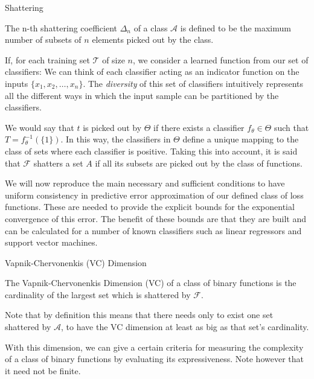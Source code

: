 \begin{appendices}
\begin{definition}{Shattering}

\end{definition}

The n-th shattering coefficient $\Delta_n$ of a class $\mathcal {A}$ is defined to be the maximum number of subsets of $n$ elements picked out by the class.

If, for each training set $\mathcal {T}$ of size $n$, we consider a learned function from our set of classifiers:
We can think of each classifier acting as an indicator function on the inputs $\{ x_1,x_2,\ldots,x_n \}$.
The \textit{diversity} of this set of classifiers intuitively represents all the different ways in which the input sample can be partitioned by the classifiers.

We would say that $t$ is picked out by $\Theta$ if there exists a classifier $f_{\theta} \in \Theta$ such that $T = f_{\theta}^{-1}(\{1\})$.
In this way, the classifiers in $\Theta$ define a unique mapping to the class of sets where each classifier is positive.
Taking this into account, it is said that $\mathcal {F}$ shatters a set $A$ if all its subsets are picked out by the class of functions.

We will now reproduce the main necessary and sufficient conditions to have uniform consistency in predictive error approximation of our defined class of loss functions.
These are needed to provide the explicit bounds for the exponential convergence of this error.
The benefit of these bounds are that they are built and can be calculated for a number of known classifiers such as linear regressors and support vector machines.


\begin{definition}{Vapnik-Chervonenkis (VC) Dimension}

The Vapnik-Chervonenkis Dimension (VC) of a class of binary functions is the cardinality of the largest set which is shattered by $\mathcal {F}$.
\end{definition}

Note that by definition this means that there needs only to exist one set shattered by $\mathcal {A}$, to have the VC dimension at least as big as that set's cardinality.

With this dimension, we can give a certain criteria for measuring the complexity of a class of binary functions by evaluating its expressiveness.
Note however that it need not be finite.


\end{appendices}
